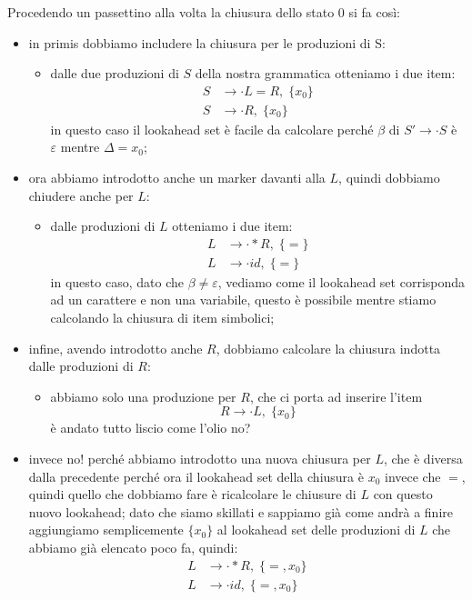 \documentclass[class=book, crop=false, oneside, 12pt]{standalone}
\begin{document}
Procedendo un passettino alla volta la chiusura dello stato 0 si fa così:
\begin{itemize}
    \item in primis dobbiamo includere la chiusura per le produzioni di S:
    \begin{itemize}
        \item dalle due produzioni di \(S\) della nostra grammatica otteniamo i due item:
        \begin{align*}
            S &\to \cdot L = R,  \; \{x_0\} \\
            S &\to \cdot R,  \; \{x_0\}
        \end{align*}
        in questo caso il lookahead set è facile da calcolare perché \(\beta\) di
        \(S' \to \cdot S\) è \(\varepsilon\) mentre \(\Delta = x_0\);
    \end{itemize}
    \item ora abbiamo introdotto anche un marker davanti alla \(L\), quindi dobbiamo chiudere anche per \(L\):
    \begin{itemize}
        \item dalle produzioni di \(L\) otteniamo i due item:
        \begin{align*}
            L &\to \cdot *R, \; \{=\} \\
            L &\to \cdot id, \; \{=\}
        \end{align*}
        in questo caso, dato che \(\beta \neq \varepsilon\), vediamo come il lookahead set corrisponda ad un carattere e non una variabile, questo è possibile mentre stiamo calcolando la chiusura di item simbolici;
    \end{itemize}
    \item infine, avendo introdotto anche \(R\), dobbiamo calcolare la chiusura indotta dalle produzioni di \(R\):
    \begin{itemize}
        \item abbiamo solo una produzione per \(R\), che ci porta ad inserire l'item 
        \begin{equation*}
            R \to \cdot L, \; \{x_0\}
        \end{equation*}
        è andato tutto liscio come l'olio no?
    \end{itemize}
    \item invece no! perché abbiamo introdotto una nuova chiusura per \(L\), che è diversa dalla precedente perché ora il lookahead set della chiusura è \(x_0\) invece che \(=\), quindi quello che dobbiamo fare è ricalcolare le chiusure di \(L\) con questo nuovo lookahead; dato che siamo skillati e sappiamo già come andrà a finire aggiungiamo semplicemente \(\{x_0\}\) al lookahead set delle produzioni di \(L\) che abbiamo già elencato poco fa, quindi:
    \begin{align*}
        L &\to \cdot *R, \; \{=, x_0\} \\
        L &\to \cdot id, \; \{=, x_0\}
    \end{align*}
\end{itemize}
\end{document}

